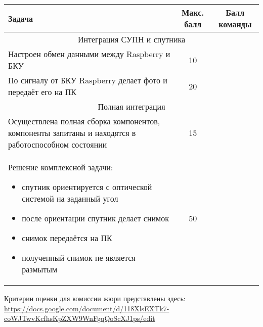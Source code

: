 \begin{table}[H]
    \begin{center}
        \begin{tabular}{|p{8cm}|c|c|}
            \hline
            Задача & Макс. балл & Балл команды \\
            \hline
            \multicolumn{3}{|c|}{Интеграция СУПН и спутника} \\
            \hline
            Настроен обмен данными между Raspberry и БКУ&	10& \\
            \hline
            По сигналу от БКУ Raspberry делает фото и передаёт его на ПК&	20	& \\
            \hline
            \multicolumn{3}{|c|}{Полная интеграция} \\
            \hline
            Осуществлена полная сборка компонентов, компоненты запитаны и находятся в работоспособном состоянии	&15& \\
            \hline
            Решение комплексной задачи:
            \begin{itemize}
                \item спутник ориентируется с оптической системой на заданный угол
                \item после ориентации спутник делает снимок
                \item снимок передаётся на ПК
                \item полученный снимок не является размытым
            \end{itemize}	& 50 & \\
            \hline	
        \end{tabular}
    \end{center}
\end{table}

Критерии оценки для комиссии жюри представлены здесь: \url{https://docs.google.com/document/d/118XlsEXTk7-coWJTwvKcfhsKpZXW9WnFgqQoScXJ1ps/edit}
